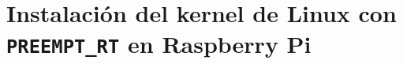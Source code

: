 \chapter{Instalación del kernel de Linux con \texttt{PREEMPT\_RT} en Raspberry Pi}
\label{app:02-preempt_rt_raspi}

